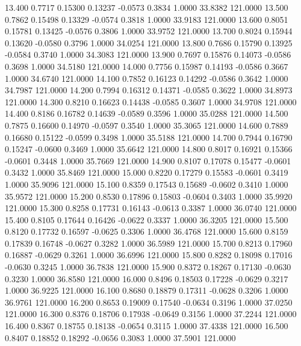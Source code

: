   13.400   0.7717   0.15300   0.13237  -0.0573   0.3834   1.0000  33.8382 121.0000
  13.500   0.7862   0.15498   0.13329  -0.0574   0.3818   1.0000  33.9183 121.0000
  13.600   0.8051   0.15781   0.13425  -0.0576   0.3806   1.0000  33.9752 121.0000
  13.700   0.8024   0.15944   0.13620  -0.0580   0.3796   1.0000  34.0254 121.0000
  13.800   0.7686   0.15790   0.13925  -0.0584   0.3740   1.0000  34.3083 121.0000
  13.900   0.7697   0.15876   0.14073  -0.0586   0.3698   1.0000  34.5180 121.0000
  14.000   0.7756   0.15987   0.14193  -0.0586   0.3667   1.0000  34.6740 121.0000
  14.100   0.7852   0.16123   0.14292  -0.0586   0.3642   1.0000  34.7987 121.0000
  14.200   0.7994   0.16312   0.14371  -0.0585   0.3622   1.0000  34.8973 121.0000
  14.300   0.8210   0.16623   0.14438  -0.0585   0.3607   1.0000  34.9708 121.0000
  14.400   0.8186   0.16782   0.14639  -0.0589   0.3596   1.0000  35.0288 121.0000
  14.500   0.7875   0.16600   0.14970  -0.0597   0.3540   1.0000  35.3065 121.0000
  14.600   0.7889   0.16680   0.15122  -0.0599   0.3498   1.0000  35.5188 121.0000
  14.700   0.7944   0.16790   0.15247  -0.0600   0.3469   1.0000  35.6642 121.0000
  14.800   0.8017   0.16921   0.15366  -0.0601   0.3448   1.0000  35.7669 121.0000
  14.900   0.8107   0.17078   0.15477  -0.0601   0.3432   1.0000  35.8469 121.0000
  15.000   0.8220   0.17279   0.15583  -0.0601   0.3419   1.0000  35.9096 121.0000
  15.100   0.8359   0.17543   0.15689  -0.0602   0.3410   1.0000  35.9572 121.0000
  15.200   0.8530   0.17896   0.15803  -0.0604   0.3403   1.0000  35.9920 121.0000
  15.300   0.8258   0.17731   0.16143  -0.0613   0.3387   1.0000  36.0740 121.0000
  15.400   0.8105   0.17644   0.16426  -0.0622   0.3337   1.0000  36.3205 121.0000
  15.500   0.8120   0.17732   0.16597  -0.0625   0.3306   1.0000  36.4768 121.0000
  15.600   0.8159   0.17839   0.16748  -0.0627   0.3282   1.0000  36.5989 121.0000
  15.700   0.8213   0.17960   0.16887  -0.0629   0.3261   1.0000  36.6996 121.0000
  15.800   0.8282   0.18098   0.17016  -0.0630   0.3245   1.0000  36.7838 121.0000
  15.900   0.8372   0.18267   0.17130  -0.0630   0.3230   1.0000  36.8580 121.0000
  16.000   0.8496   0.18503   0.17228  -0.0629   0.3217   1.0000  36.9225 121.0000
  16.100   0.8680   0.18879   0.17311  -0.0628   0.3206   1.0000  36.9761 121.0000
  16.200   0.8653   0.19009   0.17540  -0.0634   0.3196   1.0000  37.0250 121.0000
  16.300   0.8376   0.18706   0.17938  -0.0649   0.3156   1.0000  37.2244 121.0000
  16.400   0.8367   0.18755   0.18138  -0.0654   0.3115   1.0000  37.4338 121.0000
  16.500   0.8407   0.18852   0.18292  -0.0656   0.3083   1.0000  37.5901 121.0000
